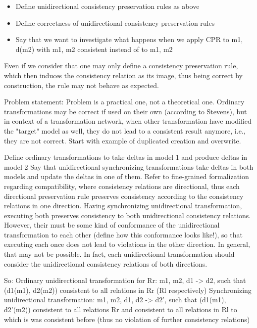 


\begin{itemize}
    \item Define unidirectional consistency preservation rules as above
    \item Define correctness of unidirectional consistency preservation rules
    \item Say that we want to investigate what happens when we apply CPR to m1, d(m2) with m1, m2 consistent instead of to m1, m2
\end{itemize}



Even if we consider that one may only define a consistency preservation rule, which then induces the consistency relation as its image, thus being correct by construction, the rule may not behave as expected.


Problem statement: Problem is a practical one, not a theoretical one.
Ordinary transformations may be correct if used on their own (according to Stevens), but in context of a transformation network, when other transformation have modified the "target" model as well, they do not lead to a consistent result anymore, i.e., they are not correct.
Start with example of duplicated creation and overwrite.

Define ordinary transformations to take deltas in model 1 and produce deltas in model 2
Say that unidirectional synchronizing transformations take deltas in both models and update the deltas in one of them.
Refer to fine-grained formalization regarding compatibility, where consistency relations are directional, thus each directional preservation rule preserves consistency according to the consistency relations in one direction.
Having synchronizing unidirectional transformation, executing both preserves consistency to both unidirectional consistency relations. However, their must be some kind of conformance of the unidirectional transformation to each other (define how this conformance looks like!), so that executing each once does not lead to violations in the other direction. In general, that may not be possible. In fact, each unidirectional transformation should consider the unidirectional consistency relations of both directions.

So:
Ordinary unidirectional transformation for Rr: m1, m2, d1 -> d2, such that (d1(m1), d2(m2)) consistent to all relations in Rr (Rl respectively)
Synchronizing unidirectional transformation: m1, m2, d1, d2 -> d2', such that (d1(m1), d2'(m2)) consistent to all relations Rr and consistent to all relations in Rl to which is was consistent before (thus no violation of further consistency relations)

